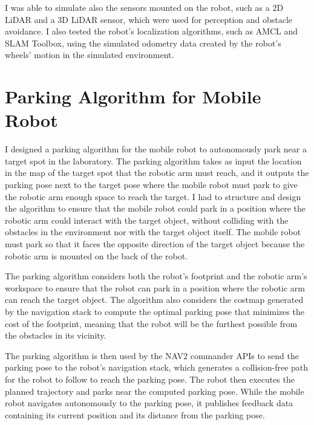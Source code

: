 I was able to simulate also the sensors mounted on the robot, such as a 2D LiDAR and a 3D LiDAR sensor, which were used
for perception and obstacle avoidance. I also tested the robot's localization algorithms, such as AMCL and SLAM Toolbox,
using the simulated odometry data created by the robot's wheels' motion in the simulated environment.



\section{Parking Algorithm for Mobile Robot}

I designed a parking algorithm for the mobile robot to autonomously park near a target spot in the laboratory.
The parking algorithm takes as input the location in the map of the target spot that the robotic arm must reach,
and it outputs the parking pose next to the target pose where the mobile robot must park to give the robotic arm
enough space to reach the target. I had to structure and design the algorithm to ensure that the mobile robot
could park in a position where the robotic arm could interact with the target object, without colliding with 
the obstacles in the environment nor with the target object itself. The mobile robot must park so that it 
faces the opposite direction of the target object because the robotic arm is mounted on the back of the robot.

The parking algorithm considers both the robot's footprint and the robotic arm's workspace to ensure that the
robot can park in a position where the robotic arm can reach the target object. 
The algorithm also considers the costmap generated by the navigation stack to compute the optimal parking
pose that minimizes the cost of the footprint, meaning that the robot will be the furthest possible from
the obstacles in its vicinity. 

The parking algorithm is then used by the NAV2 commander APIs to send the parking pose to the robot's navigation stack,
which generates a collision-free path for the robot to follow to reach the parking pose. The robot then executes
the planned trajectory and parks near the computed parking pose. While the mobile robot navigates
autonomously to the parking pose, it publishes feedback data containing its current position and its distance 
from the parking pose. 

